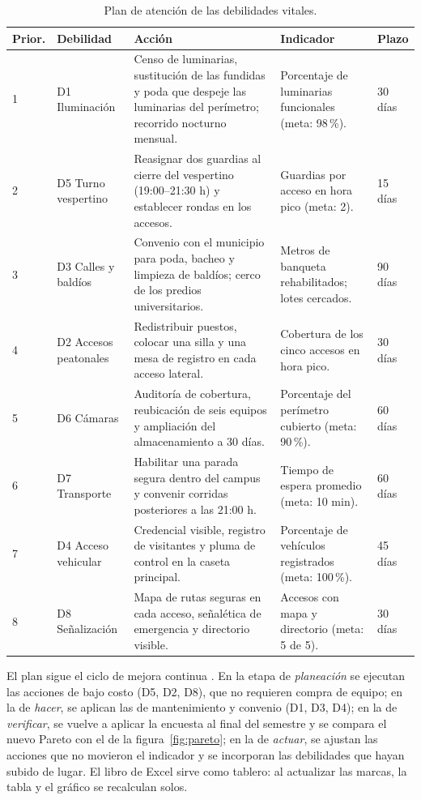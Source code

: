 \documentclass[11pt,a4paper]{article}
\begin{document}
\begin{table}[H]
\centering
\footnotesize
\caption{Plan de atención de las debilidades vitales.}
\label{tab:plan}
\begin{tabularx}{\linewidth}{@{}L{1.15cm}L{3.0cm}L{5.6cm}L{3.25cm}L{1.3cm}@{}}
\toprule
\textbf{Prior.} & \textbf{Debilidad} & \textbf{Acción} & \textbf{Indicador} & \textbf{Plazo} \\
 & D1 Iluminación &
    Censo de luminarias, sustitución de las fundidas y poda que despeje las
    luminarias del perímetro; recorrido nocturno mensual. &
    Porcentaje de luminarias funcionales (meta: 98\,\%). & 30 días \\
2 & D5 Turno vespertino &
    Reasignar dos guardias al cierre del vespertino (19:00--21:30 h) y
    establecer rondas en los accesos. &
    Guardias por acceso en hora pico (meta: 2). & 15 días \\
3 & D3 Calles y baldíos &
    Convenio con el municipio para poda, bacheo y limpieza de baldíos; cerco
    de los predios universitarios. &
    Metros de banqueta rehabilitados; lotes cercados. & 90 días \\
4 & D2 Accesos peatonales &
    Redistribuir puestos, colocar una silla y una mesa de registro en cada
    acceso lateral. &
    Cobertura de los cinco accesos en hora pico. & 30 días \\
5 & D6 Cámaras &
    Auditoría de cobertura, reubicación de seis equipos y ampliación del
    almacenamiento a 30 días. &
    Porcentaje del perímetro cubierto (meta: 90\,\%). & 60 días \\
6 & D7 Transporte &
    Habilitar una parada segura dentro del campus y convenir corridas
    posteriores a las 21:00 h. &
    Tiempo de espera promedio (meta: 10 min). & 60 días \\
7 & D4 Acceso vehicular &
    Credencial visible, registro de visitantes y pluma de control en la
    caseta principal. &
    Porcentaje de vehículos registrados (meta: 100\,\%). & 45 días \\
8 & D8 Señalización &
    Mapa de rutas seguras en cada acceso, señalética de emergencia y
    directorio visible. &
    Accesos con mapa y directorio (meta: 5 de 5). & 30 días \\
\bottomrule
\end{tabularx}
\end{table}

El plan sigue el ciclo de mejora continua \cite{deming1989}. En la etapa de
\emph{planeación} se ejecutan las acciones de bajo costo (D5, D2, D8), que no
requieren compra de equipo; en la de \emph{hacer}, se aplican las de
mantenimiento y convenio (D1, D3, D4); en la de \emph{verificar}, se vuelve a
aplicar la encuesta al final del semestre y se compara el nuevo Pareto con el de
la figura~\ref{fig:pareto}; en la de \emph{actuar}, se ajustan las acciones que
no movieron el indicador y se incorporan las debilidades que hayan subido de
lugar. El libro de Excel sirve como tablero: al actualizar las marcas, la tabla y
el gráfico se recalculan solos.
\end{document}
